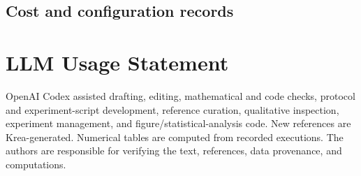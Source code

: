 \subsection{Cost and configuration records}

\section*{LLM Usage Statement}
OpenAI Codex assisted drafting, editing, mathematical and code checks,
protocol and experiment-script development, reference curation, qualitative
inspection, experiment management, and figure/statistical-analysis code.
New references are Krea-generated. Numerical tables are computed from
recorded executions. The authors are responsible for verifying the text,
references, data provenance, and computations.
